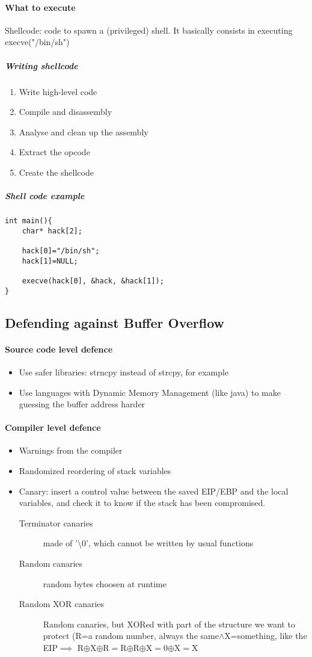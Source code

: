 \documentclass{article}
\newcommand{\xor}{\oplus}
\begin{document}
\paragraph{What to execute} Shellcode: code to spawn a (privileged) shell. It basically consists in executing execve("/bin/sh") 
\subparagraph{Writing shellcode}
\begin{enumerate}
\item Write high-level code
\item Compile and disassembly
\item Analyse and clean up the assembly
\item Extract the opcode
\item Create the shellcode
\end{enumerate}
\subparagraph{Shell code example}
\begin{lstlisting}[style=CStyle]
int main(){
	char* hack[2];
	
	hack[0]="/bin/sh";
	hack[1]=NULL;
	
	execve(hack[0], &hack, &hack[1]);
}
\end{lstlisting}
\subsection{Defending against Buffer Overflow}
\paragraph{Source code level defence}
\begin{itemize}
\item Use safer libraries: strncpy instead of strcpy, for example
\item Use languages with Dynamic Memory Management (like java) to make guessing the buffer address harder
\end{itemize}
\paragraph{Compiler level defence}
\begin{itemize}
\item Warnings from the compiler
\item Randomized reordering of stack variables
\item Canary: insert a control value between the saved EIP/EBP and the local variables, and check it to know if the stack has been compromised. 
	\begin{description}
	\item[Terminator canaries] made of '\textbackslash 0', which cannot be written by usual functions
	\item[Random canaries] random bytes choosen at runtime
	\item[Random XOR canaries] Random canaries, but XORed with part of the structure we want to protect (R=a random number, always the same$\wedge$X=something, like the EIP$\implies$ R$\xor$X$\xor$R$=$R$\xor$R$\xor$X$=$0$\xor$X$=$X
	\end{description}
\end{itemize}
\end{document}
